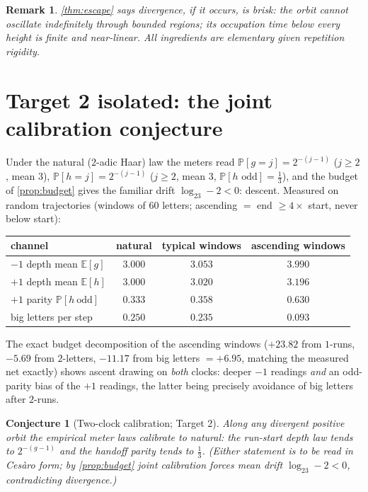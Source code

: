 \documentclass[11pt]{article}
\newtheorem{conjecture}{Conjecture}
\newtheorem*{remark}{Remark}
\begin{document}
\begin{remark}
\cref{thm:escape} says divergence, if it occurs, is \emph{brisk}: the
orbit cannot oscillate indefinitely through bounded regions; its
occupation time below every height is finite and near-linear. All
ingredients are elementary given repetition rigidity.
\end{remark}

\section{Target 2 isolated: the joint calibration conjecture}

Under the natural ($2$-adic Haar) law the meters read
$\mathbb P[g=j]=2^{-(j-1)}$ ($j\ge2$, mean $3$),
$\mathbb P[h=j]=2^{-(j-1)}$ ($j\ge2$, mean $3$,
$\mathbb P[h\text{ odd}]=\tfrac13$), and the budget of
\cref{prop:budget} gives the familiar drift $\log_23-2<0$: descent.
Measured on random trajectories (windows of $60$ letters; ascending
$=$ end $\ge4\times$ start, never below start):

\begin{center}
\begin{tabular}{lccc}
\toprule
channel & natural & typical windows & ascending windows\\
\midrule
$-1$ depth mean $\mathbb E[g]$ & $3.000$ & $3.053$ & $3.990$\\
$+1$ depth mean $\mathbb E[h]$ & $3.000$ & $3.020$ & $3.196$\\
$+1$ parity $\mathbb P[h\ \mathrm{odd}]$ & $0.333$ & $0.358$ & $\mathbf{0.630}$\\
big letters per step & $0.250$ & $0.235$ & $0.093$\\
\bottomrule
\end{tabular}
\end{center}

\noindent The exact budget decomposition of the ascending windows
($+23.82$ from $1$-runs, $-5.69$ from $2$-letters, $-11.17$ from big
letters $=+6.95$, matching the measured net exactly) shows ascent drawing
on \emph{both} clocks: deeper $-1$ readings \emph{and} an odd-parity
bias of the $+1$ readings, the latter being precisely avoidance of big
letters after $2$-runs.

\begin{conjecture}[Two-clock calibration; Target 2]\label{conj:cal}
Along any divergent positive orbit the empirical meter laws calibrate
to natural: the run-start depth law tends to $2^{-(g-1)}$ \emph{and}
the handoff parity tends to $\tfrac13$. (Either statement is to be
read in Ces\`aro form; by \cref{prop:budget} joint calibration forces
mean drift $\log_23-2<0$, contradicting divergence.)
\end{conjecture}
\end{document}
